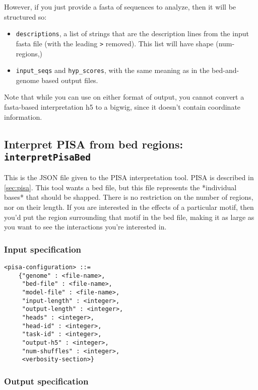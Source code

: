 \documentclass{article}
\begin{document}
However, if you just provide a fasta of sequences to analyze, then it will be structured so:

\begin{itemize}
    \item \texttt{descriptions}, a list of strings that are the description lines from
        the input fasta file (with the leading \texttt{>} removed). This list will have shape
        (num-regions,)
    \item \texttt{input\_seqs} and \texttt{hyp\_scores}, with the same meaning
        as in the bed-and-genome based output files.
\end{itemize}

Note that while you can use  on either format of  output,
you cannot convert a fasta-based interpretation h5 to a bigwig, since it doesn't contain
coordinate information.


\newpage
\subsection{Interpret PISA from bed regions: \texttt{interpretPisaBed}}\label{prog:interpretPisaBed}

This is the JSON file given to the PISA interpretation tool. PISA is described in \ref{sec:pisa}.
This tool wants a bed file, but this file represents the *individual bases* that should be shapped.
There is no restriction on the number of regions, nor on their length. If you are interested in
the effects of a particular motif,
then you'd put the region surrounding that motif in the bed file, making it as large as you want
to see the interactions you're interested in.

\subsubsection{Input specification}

\begin{lstlisting}
<pisa-configuration> ::=
    {"genome" : <file-name>,
     "bed-file" : <file-name>,
     "model-file" : <file-name>,
     "input-length" : <integer>,
     "output-length" : <integer>,
     "heads" : <integer>,
     "head-id" : <integer>,
     "task-id" : <integer>,
     "output-h5" : <integer>,
     "num-shuffles" : <integer>,
     <verbosity-section>}
\end{lstlisting}

\subsubsection{Output specification}
\end{document}
